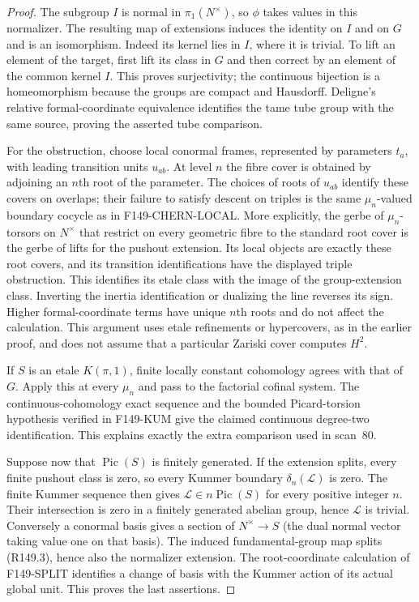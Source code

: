 \begin{proof}
The subgroup $I$ is normal in $\pi_1(N^\times)$, so $\phi$
takes values in this normalizer. The resulting map of extensions
induces the identity on $I$ and on $G$ and is an isomorphism.
Indeed its kernel lies in $I$, where it is trivial. To lift an
element of the target, first lift its class in $G$ and then correct
by an element of the common kernel $I$. This proves surjectivity;
the continuous bijection is a homeomorphism because the groups
are compact and Hausdorff. Deligne's relative formal-coordinate
equivalence identifies the tame tube group with the same source,
proving the asserted tube comparison.

For the obstruction, choose local conormal frames, represented by
parameters $t_a$, with leading transition units $u_{ab}$. At level
$n$ the fibre cover is obtained by adjoining an $n$th root of the
parameter. The choices of roots of $u_{ab}$ identify these covers
on overlaps; their failure to satisfy descent on triples is the
same $\mu_n$-valued boundary cocycle as in F149-CHERN-LOCAL.
More explicitly, the gerbe of $\mu_n$-torsors on $N^\times$
that restrict on every geometric fibre to the standard root cover
is the gerbe of lifts for the pushout extension. Its local objects
are exactly these root covers, and its transition identifications
have the displayed triple obstruction. This identifies its etale
class with the image of the group-extension class. Inverting the
inertia identification or dualizing the
line reverses its sign. Higher formal-coordinate terms have unique
$n$th roots and do not affect the calculation. This argument uses
etale refinements or hypercovers, as in the earlier proof, and does
not assume that a particular Zariski cover computes $H^2$.

If $S$ is an etale $K(\pi,1)$, finite locally constant cohomology
agrees with that of $G$. Apply this at every $\mu_n$ and pass to
the factorial cofinal system. The continuous-cohomology exact
sequence and the bounded Picard-torsion hypothesis verified in
F149-KUM give the claimed continuous degree-two identification.
This explains exactly the extra comparison used in scan~80.

Suppose now that $\operatorname{Pic}(S)$ is finitely generated.
If the extension splits, every finite pushout class is zero, so
every Kummer boundary $\delta_n(\mathcal L)$ is zero. The finite
Kummer sequence then gives $\mathcal L\in n\operatorname{Pic}(S)$
for every positive integer $n$. Their intersection is zero in a
finitely generated abelian group, hence $\mathcal L$ is trivial.
Conversely a conormal basis gives a section of $N^\times\to S$
(the dual normal vector taking value one on that basis). The
induced fundamental-group map splits (R149.3), hence also the
normalizer extension. The root-coordinate calculation of
F149-SPLIT identifies a change of basis with the Kummer action of
its actual global unit. This proves the last assertions.
\end{proof}

